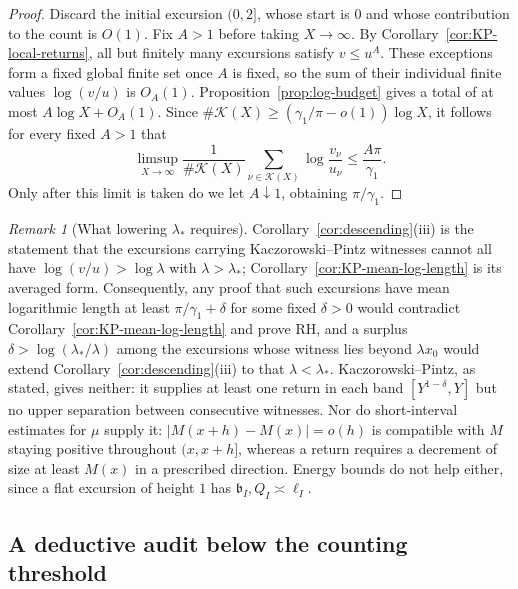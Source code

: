 \documentclass[11pt,reqno]{amsart}
\numberwithin{equation}{section}
\theoremstyle{plain}
\theoremstyle{definition}
\theoremstyle{remark}
\newtheorem{remark}[theorem]{Remark}
\begin{document}
\begin{proof}
Discard the initial excursion $(0,2]$, whose start is $0$ and whose
contribution to the count is $O(1)$. Fix $A>1$ before taking $X\to\infty$.
By Corollary~\ref{cor:KP-local-returns}, all but finitely many excursions
satisfy $v\le u^A$. These exceptions form a fixed global finite set once
$A$ is fixed, so the sum of their individual finite values $\log(v/u)$ is
$O_A(1)$. Proposition~\ref{prop:log-budget} gives a total of at most
$A\log X+O_A(1)$. Since
$\#\mathcal K(X)\ge(\gamma_1/\pi-o(1))\log X$, it follows for every fixed
$A>1$ that
\begin{equation}
\limsup_{X\to\infty}
\frac1{\#\mathcal K(X)}\sum_{\nu\in\mathcal K(X)}
\log\frac{v_\nu}{u_\nu}
\le \frac{A\pi}{\gamma_1}.
\end{equation}
Only after this limit is taken do we let $A\downarrow1$, obtaining
$\pi/\gamma_1$.
\end{proof}

\begin{remark}[What lowering $\lambda_*$ requires]
\label{rem:surplus}
Corollary~\ref{cor:descending}(iii) is the statement that the
excursions carrying Kaczorowski--Pintz witnesses cannot all have
$\log(v/u)>\log\lambda$ with $\lambda>\lambda_*$;
Corollary~\ref{cor:KP-mean-log-length} is its averaged form. Consequently,
any proof that such excursions have mean logarithmic length at least
$\pi/\gamma_1+\delta$ for some fixed $\delta>0$ would contradict
Corollary~\ref{cor:KP-mean-log-length} and prove RH, and a surplus
$\delta>\log(\lambda_*/\lambda)$ among the excursions whose witness lies
beyond $\lambda x_0$ would extend Corollary~\ref{cor:descending}(iii) to
that $\lambda<\lambda_*$. Kaczorowski--Pintz, as stated, gives neither: it
supplies at least one return in each band $[Y^{1-\delta},Y]$ but no upper
separation between consecutive witnesses. Nor do short-interval estimates
for $\mu$ supply it: $|M(x+h)-M(x)|=o(h)$ is compatible with $M$ staying
positive throughout $(x,x+h]$, whereas a return requires a decrement of
size at least $M(x)$ in a prescribed direction. Energy bounds do not help
either, since a flat excursion of height $1$ has $\mathfrak b_I,Q_I\asymp\ell_I$.
\end{remark}

\subsection{A deductive audit below the counting threshold}
\label{subsec:surplus-audit}
\end{document}
